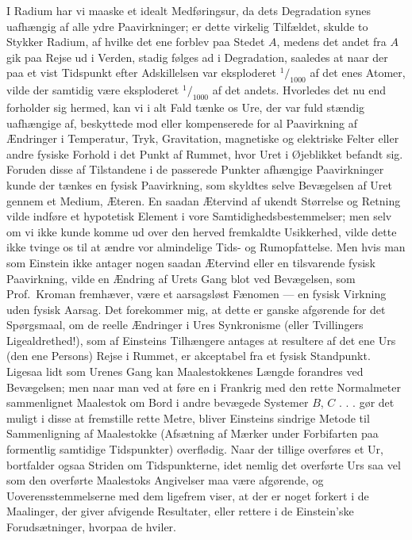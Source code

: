 \documentclass[12pt,a4paper]{article}
\newcommand{\opage}[1]{\marginnote{\footnotesize\textit{[#1]}}}
\begin{document}
I Radium har vi maaske et idealt Medføringsur, da dets Degradation synes
uafhængig af alle ydre Paavirkninger; er dette virkelig Tilfældet, skulde to
Stykker Radium, af hvilke det ene forblev paa Stedet $A$, medens det andet fra
$A$ gik paa Rejse ud i Verden, stadig følges ad i Degradation, saaledes at naar
der paa et vist Tidspunkt efter Adskillelsen var eksploderet
$^{1}\!/_{1000}$ af det enes Atomer, vilde der samtidig være eksploderet
$^{1}\!/_{1000}$ af det andets. Hvorledes det nu end forholder sig hermed, kan
vi i alt Fald tænke os Ure, der var fuld\-%
\opage{6}stændig uafhængige af, beskyttede mod eller kompenserede for al Paavirkning af
Ændringer i Temperatur, Tryk, Gravitation, magnetiske og elektriske Felter
eller andre fysiske Forhold i det Punkt af Rummet, hvor Uret i Øjeblikket
befandt sig. Foruden disse af Tilstandene i de passerede Punkter afhængige
Paavirkninger kunde der tænkes en fysisk Paavirkning, som skyldtes selve
Bevægelsen af Uret gennem et Medium, Æteren. En saadan \guillemotright
Ætervind\guillemotleft{} af ukendt Størrelse og Retning vilde indføre et
hypotetisk Element i vore Samtidighedsbestemmelser; men selv om vi ikke kunde
komme ud over den herved fremkaldte Usikkerhed, vilde dette ikke tvinge os til
at ændre vor almindelige Tids- og Rumopfattelse. Men hvis man som Einstein ikke
antager nogen saadan Ætervind eller en tilsvarende fysisk Paavirkning, vilde en
Ændring af Urets Gang blot ved Bevægelsen, som Prof.\ Kroman fremhæver, være
\guillemotright et aarsagsløst Fænomen\guillemotleft{} --- en fysisk Virkning
uden fysisk Aarsag. Det forekommer mig, at dette er ganske afgørende for det
Spørgsmaal, om de reelle Ændringer i Ures Synkronisme (eller Tvillingers
Ligealdrethed!), som af Einsteins Tilhængere antages at resultere af det ene
Urs (den ene Persons) Rejse i Rummet, er akceptabel fra et fysisk Standpunkt.
Ligesaa lidt som Urenes Gang kan Maalestokkenes Længde forandres ved
Bevægelsen; men naar man ved at føre en i Frankrig med den rette Normalmeter
sammenlignet Maalestok \guillemotright om Bord\guillemotleft{} i andre bevægede
Systemer $B$, $C$ . . . gør det muligt i disse at fremstille rette Metre,
bliver Einsteins sindrige Metode til Sammenligning af Maalestokke (Afsætning af
Mærker under Forbifarten paa formentlig samtidige Tidspunkter) overflødig. Naar
der tillige overføres et Ur, bortfalder ogsaa Striden om Tidspunkterne, idet
nemlig det overførte Urs saa vel som den overførte Maalestoks Angivelser maa
være afgørende, og Uoverensstemmelserne med dem ligefrem viser, at der er noget
forkert i de Maalinger, der giver afvigende Resultater, eller rettere i de
Einstein'ske Forudsætninger, hvorpaa de hviler.
\end{document}
